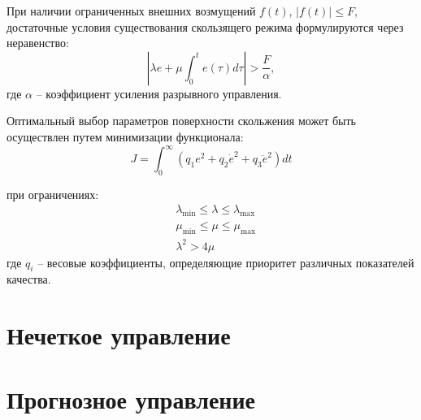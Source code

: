 При наличии ограниченных внешних возмущений $f(t)$, $|f(t)| \leq F$, достаточные условия существования
скользящего режима формулируются через неравенство:
\begin{equation*}
	|\lambda e + \mu\int_0^t e(\tau)d\tau| > \frac{F}{\alpha},
\end{equation*}
где $\alpha$ -- коэффициент усиления разрывного управления.

Оптимальный выбор параметров поверхности скольжения может быть осуществлен путем минимизации функционала:
\begin{equation*}
	J = \int_0^\infty (q_1e^2 + q_2\dot{e}^2 + q_3\ddot{e}^2)dt
\end{equation*}

при ограничениях:
\begin{equation*}
	\begin{aligned}
		 & \lambda_\text{min} \leq \lambda \leq \lambda_\text{max} \\
		 & \mu_\text{min} \leq \mu \leq \mu_\text{max}             \\
		 & \lambda^2 > 4\mu
	\end{aligned}
\end{equation*}
где $q_i$ -- весовые коэффициенты, определяющие приоритет различных показателей качества.

\section{Нечеткое управление}\label{sec:ch3/sec4}

\section{Прогнозное управление}\label{sec:ch3/sec5}
